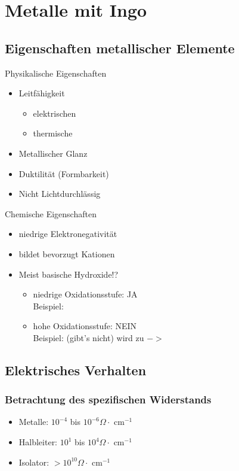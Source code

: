 \documentclass[a4paper, 12pt]{article}
\begin{document}
\section{Metalle mit Ingo}
\subsection{Eigenschaften metallischer Elemente}
Physikalische Eigenschaften
\begin{itemize}
    \item Leitfähigkeit
    \begin{itemize}
        \item elektrischen
        \item thermische
    \end{itemize}
    \item Metallischer Glanz
    \item Duktilität (Formbarkeit)
    \item Nicht Lichtdurchlässig
\end{itemize}
Chemische Eigenschaften
\begin{itemize}
    \item niedrige Elektronegativität
    \item bildet bevorzugt Kationen
    \item Meist basische Hydroxide!?
    \begin{itemize}
        \item niedrige Oxidationsstufe: JA \\Beispiel: 
        \item hohe Oxidationsstufe: NEIN \\Beispiel:  (gibt's nicht) wird zu  $->$\\ 
    \end{itemize}
\end{itemize}
\subsection{Elektrisches Verhalten}
\subsubsection{Betrachtung des spezifischen Widerstands}
\begin{itemize}
    \item Metalle: $10^{-4}$ bis $10^{-6} \Omega\cdot$ cm$^{-1}$
    \item Halbleiter: $10^{1}$ bis $10^{4} \Omega\cdot$ cm$^{-1}$
    \item Isolator: $> 10^{10} \Omega\cdot$ cm$^{-1}$
\end{itemize}
\end{document}
